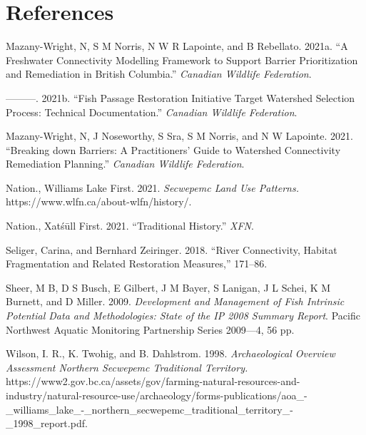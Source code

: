 \documentclass[
  letterpaper,
  DIV=11,
  numbers=noendperiod]{scrreprt}
\newlength{\cslhangindent}
\newenvironment{CSLReferences}[2] %
 {\begin{list}{}{%
  \setlength{\itemindent}{0pt}
  \setlength{\leftmargin}{0pt}
  \setlength{\parsep}{0pt}
  \ifodd #1
   \setlength{\leftmargin}{\cslhangindent}
   \setlength{\itemindent}{-1\cslhangindent}
  \fi
  \setlength{\itemsep}{#2\baselineskip}}}
 {\end{list}}
\begin{document}

\chapter*{References}\label{references}


\label{refs}
\begin{CSLReferences}{1}{0}
Mazany-Wright, N, S M Norris, N W R Lapointe, and B Rebellato. 2021a.
{``A Freshwater Connectivity Modelling Framework to Support Barrier
Prioritization and Remediation in British Columbia.''} \emph{Canadian
Wildlife Federation}.

---------. 2021b. {``Fish Passage Restoration Initiative Target
Watershed Selection Process: Technical Documentation.''} \emph{Canadian
Wildlife Federation}.

Mazany-Wright, N, J Noseworthy, S Sra, S M Norris, and N W Lapointe.
2021. {``Breaking down Barriers: A Practitioners' Guide to Watershed
Connectivity Remediation Planning.''} \emph{Canadian Wildlife
Federation}.

Nation., Williams Lake First. 2021. \emph{Secwepemc Land Use Patterns.}
https://www.wlfn.ca/about-wlfn/history/.

Nation., Xatśūll First. 2021. {``Traditional History.''} \emph{XFN}.

Seliger, Carina, and Bernhard Zeiringer. 2018. {``River Connectivity,
Habitat Fragmentation and Related Restoration Measures,''} 171--86.

Sheer, M B, D S Busch, E Gilbert, J M Bayer, S Lanigan, J L Schei, K M
Burnett, and D Miller. 2009. \emph{Development and Management of Fish
Intrinsic Potential Data and Methodologies: State of the {IP} 2008
Summary Report}. Pacific Northwest Aquatic Monitoring Partnership Series
2009---4, 56 pp.

Wilson, I. R., K. Twohig, and B. Dahlstrom. 1998. \emph{Archaeological
Overview Assessment Northern Secwepemc Traditional Territory.}
https://www2.gov.bc.ca/assets/gov/farming-natural-resources-and-industry/natural-resource-use/archaeology/forms-publications/aoa\_-\_williams\_lake\_-\_northern\_secwepemc\_traditional\_territory\_-\_1998\_report.pdf.

\end{CSLReferences}
\end{document}
